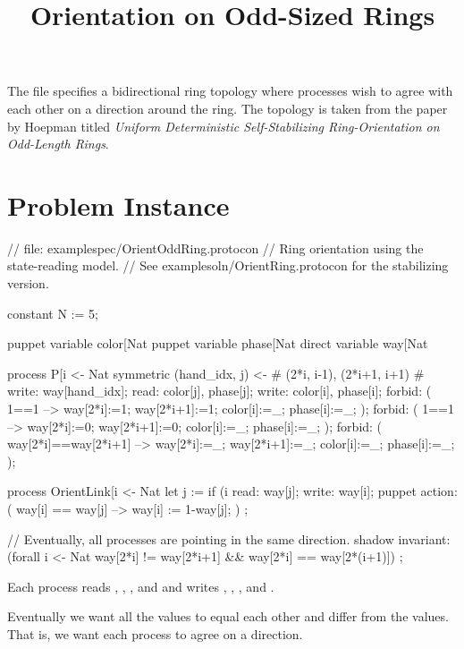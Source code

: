 
\title{Orientation on Odd-Sized Rings}
\date{}



The  file specifies a bidirectional ring topology where processes wish to agree with each other on a direction around the ring.
The topology is taken from the paper by Hoepman titled \textit{Uniform Deterministic Self-Stabilizing Ring-Orientation on Odd-Length Rings}.

\section{Problem Instance}
\begin{code}
// file: examplespec/OrientOddRing.protocon
// Ring orientation using the state-reading model.
// See examplesoln/OrientRing.protocon for the stabilizing version.

constant N := 5;

puppet variable color[Nat %
puppet variable phase[Nat %
direct variable way[Nat %

process P[i <- Nat %
{
  symmetric (hand_idx, j)  <- {# (2*i, i-1), (2*i+1, i+1) #}
  {
    write: way[hand_idx];
    read: color[j], phase[j];
  }
  write: color[i], phase[i];
  forbid: ( 1==1 --> way[2*i]:=1; way[2*i+1]:=1; color[i]:=_; phase[i]:=_; );
  forbid: ( 1==1 --> way[2*i]:=0; way[2*i+1]:=0; color[i]:=_; phase[i]:=_; );
  forbid: ( way[2*i]==way[2*i+1] --> way[2*i]:=_; way[2*i+1]:=_; color[i]:=_; phase[i]:=_; );
}

process OrientLink[i <- Nat %
{
  let j := if (i %
  read: way[j];
  write: way[i];
  puppet action:
    ( way[i] == way[j] --> way[i] := 1-way[j]; )
    ;
}

// Eventually, all processes are pointing in the same direction.
shadow invariant:
  (forall i <- Nat %
   way[2*i] != way[2*i+1]
   &&
   way[2*i] == way[2*(i+1)])
  ;
\end{code}

Each process  reads , , , and  and writes , , , and .

Eventually we want all the  values to equal each other and differ from the  values.
That is, we want each process to agree on a direction.

